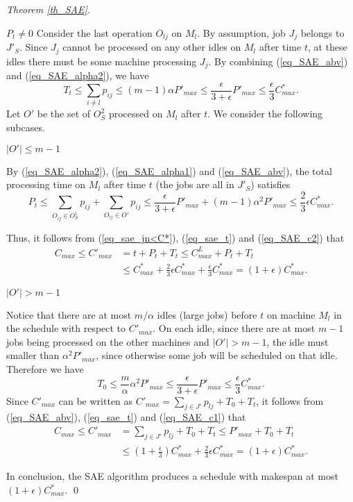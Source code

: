 \documentclass{llncs}
\newcommand{\be}{\begin{equation}}
\newcommand{\ee}{\end{equation}}
\numberwithin{subcase}{case}
\begin{document}
\begin{proof}[Theorem \ref{th_SAE}]
\begin{case}{$P_t \neq 0$}
Consider the last operation $O_{lj}$ on $M_l$. By assumption, job $J_j$ belongs to $J'_S$. Since $J_j$ cannot be processed on any other idles on $M_l$ after time $t$, at these idles there must be some machine processing $J_j$. By combining (\ref{eq_SAE_abv}) and (\ref{eq_SAE_alpha2}), we have
\be
T_t \leq \sum_{i \neq l}p_{ij} \leq (m-1)\alpha P'_{max} \leq \frac{\epsilon}{3 + \epsilon}P'_{max}\leq \frac{\epsilon}{3}C^*_{max}.\label{eq_sae_t}
\ee
Let $O'$ be the set of $O^2_S$ processed on $M_l$ after $t$. We consider the following subcases.

\begin{subcase}{$|O'|\leq m-1$}

By (\ref{eq_SAE_alpha2}), (\ref{eq_SAE_alpha1}) and (\ref{eq_SAE_abv}), the total processing time on $M_l$ after time $t$ (the jobs are all in $J'_S$) satisfies
\be
P_t \leq \sum_{O_{ij}\in O^1_S} p_{ij} + \sum_{O_{ij}\in O'} p_{ij} \leq \frac{\epsilon}{3 + \epsilon}P'_{max} + (m-1)\alpha^2P'_{max} \leq \frac{2}{3}\epsilon C^*_{max}. \label{eq_SAE_c2}
\ee

Thus, it follows from (\ref{eq_sae_jn<C*}), (\ref{eq_sae_t}) and (\ref{eq_SAE_c2}) that
\be
\begin{split}
C_{max}  \leq C'_{max}&  = t + P_t + T_t \leq C^L_{max} + P_t + T_t\\
&\leq C^*_{max} + \frac{2}{3}\epsilon C^*_{max} + \frac{\epsilon}{3}C^*_{max} = (1 + \epsilon)C^*_{max}.
\end{split}
\ee
\end{subcase}

\begin{subcase}{$|O'|> m-1$}

Notice that there are at most $m/\alpha$ idles (large jobs) before $t$ on machine $M_l$ in the schedule with respect to $C'_{max}$. On each idle, since there are at most $m-1$ jobs being processed on the other machines and $|O'|> m-1$, the idle must smaller than $\alpha^2 P'_{max}$, since otherwise some job will be scheduled on that idle. Therefore we have
\be
T_0 \leq \frac{m}{\alpha}\alpha^2P'_{max} \leq \frac{\epsilon}{3 + \epsilon}P'_{max} \leq \frac{\epsilon}{3}C^*_{max}. \label{eq_SAE_c1}
\ee
Since $C'_{max}$ can be written as $C'_{max} = \sum_{j\in J'}p_{lj} + T_0 + T_t$, it follows from (\ref{eq_SAE_abv}), (\ref{eq_sae_t}) and (\ref{eq_SAE_c1}) that
\be
\begin{split}
C_{max}  \leq C'_{max}&  = \sum_{j\in J'}p_{lj} + T_0 + T_t \leq P'_{max} + T_0 + T_t\\
&\leq (1 + \frac{\epsilon}{3})C^*_{max} + \frac{2}{3}\epsilon C^*_{max} = (1 + \epsilon)C^*_{max}.
\end{split}
\ee

\end{subcase}
\end{case}
In conclusion, the SAE algorithm produces a schedule with makespan at most $(1 + \epsilon)C^*_{max}$.
\qed
\end{proof}
\end{document}
